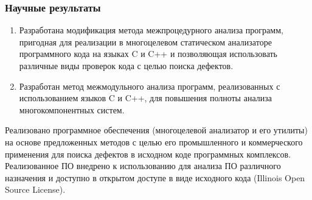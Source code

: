\documentclass[hyperref={pdfpagelabels=false},10pt,gray]{beamer}
\begin{document}


\begin{frame}
\frametitle{Научные результаты}

\begin{enumerate}
  \item Разработана модификация метода межпроцедурного анализа программ, пригодная для реализации в многоцелевом статическом анализаторе программного кода на языках C и C++ и позволяющая использовать различные виды проверок кода с целью поиска дефектов.
  \item Разработан метод межмодульного анализа программ, реализованных с использованием языков C и C++, для повышения полноты анализа многокомпонентных систем.
\end{enumerate}


   Реализовано программное обеспечения (многоцелевой анализатор и его утилиты) на основе предложенных методов с целью его промышленного и коммерческого применения для поиска дефектов в исходном коде программных комплексов. Реализованное ПО внедрено к использованию для анализа ПО различного назначения и доступно в открытом доступе в виде исходного кода (Illinois Open Source License).

\end{frame}
\end{document}
